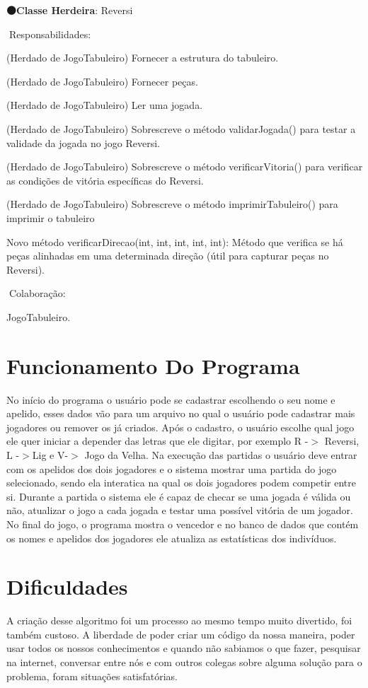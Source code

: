 {\bfseries 🟠\+Classe Herdeira}\+: Reversi

🧐\+Responsabilidades\+:

(Herdado de Jogo\+Tabuleiro) Fornecer a estrutura do tabuleiro.

(Herdado de Jogo\+Tabuleiro) Fornecer peças.

(Herdado de Jogo\+Tabuleiro) Ler uma jogada.

(Herdado de Jogo\+Tabuleiro) Sobrescreve o método validar\+Jogada() para testar a validade da jogada no jogo Reversi.

(Herdado de Jogo\+Tabuleiro) Sobrescreve o método verificar\+Vitoria() para verificar as condições de vitória específicas do Reversi.

(Herdado de Jogo\+Tabuleiro) Sobrescreve o método imprimir\+Tabuleiro() para imprimir o tabuleiro

Novo método verificar\+Direcao(int, int, int, int, int)\+: Método que verifica se há peças alinhadas em uma determinada direção (útil para capturar peças no Reversi).

🤝\+Colaboração\+:

Jogo\+Tabuleiro.\hypertarget{md_README_autotoc_md1}{}\section{Funcionamento Do Programa 🧑‍💻}\label{md_README_autotoc_md1}
No início do programa o usuário pode se cadastrar escolhendo o seu nome e apelido, esses dados vão para um arquivo no qual o usuário pode cadastrar mais jogadores ou remover os já criados. Após o cadastro, o usuário escolhe qual jogo ele quer iniciar a depender das letras que ele digitar, por exemplo R -\/$>$ Reversi, L -\/$>$Lig e V-\/$>$ Jogo da Velha. Na execução das partidas o usuário deve entrar com os apelidos dos dois jogadores e o sistema mostrar uma partida do jogo selecionado, sendo ela interatica na qual os dois jogadores podem competir entre si. Durante a partida o sistema ele é capaz de checar se uma jogada é válida ou não, atualizar o jogo a cada jogada e testar uma possível vitória de um jogador. No final do jogo, o programa mostra o vencedor e no banco de dados que contém os nomes e apelidos dos jogadores ele atualiza as estatísticas dos indivíduos.\hypertarget{md_README_autotoc_md2}{}\section{Dificuldades 😮‍💨}\label{md_README_autotoc_md2}
A criação desse algoritmo foi um processo ao mesmo tempo muito divertido, foi também custoso. A liberdade de poder criar um código da nossa maneira, poder usar todos os nossos conhecimentos e quando não sabiamos o que fazer, pesquisar na internet, conversar entre nós e com outros colegas sobre alguma solução para o problema, foram situações satisfatórias.

